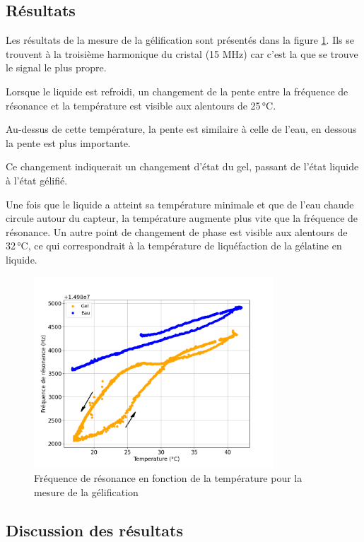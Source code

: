 \subsection{Résultats}

Les résultats de la mesure de la gélification sont présentés dans la figure \ref{fig:Frequence gelification}. Ils se trouvent à la troisième harmonique du cristal (15 MHz) car c'est la que se trouve le signal le plus propre. 

Lorsque le liquide est refroidi, un changement de la pente entre la fréquence de résonance et la température est visible aux alentours de 25 °C. 

Au-dessus de cette température, la pente est similaire à celle de l'eau, en dessous la pente est plus importante.  

Ce changement indiquerait un changement d'état du gel, passant de l'état liquide à l'état gélifié.

Une fois que le liquide a atteint sa température minimale et que de l'eau chaude circule autour du capteur, la température augmente plus vite que la fréquence de résonance. Un autre point de changement de phase est visible aux alentours de 32 °C, ce qui correspondrait à la température de liquéfaction de la gélatine en liquide.

\begin{figure}[H]
    \centering
    \includegraphics[width=0.8\textwidth]{assets/figures/gel.png}
    \caption{Fréquence de résonance en fonction de la température pour la mesure de la gélification}
    \label{fig:Frequence gelification}
\end{figure}

\subsection{Discussion des résultats}

